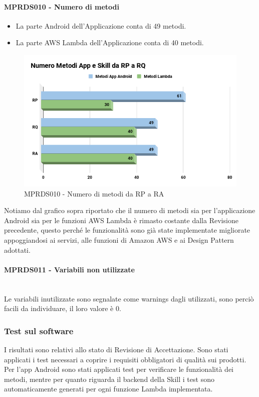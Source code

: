 \paragraph{MPRDS010 - Numero di metodi}
\begin{itemize}
	\item La parte Android dell'Applicazione conta di 49 metodi.
	\item La parte AWS Lambda dell'Applicazione conta di 40 metodi.
\end{itemize}
\begin{figure}[H]
	\centering
	\includegraphics[width=13cm,keepaspectratio]{../includes/pics/nMetodiRA.png}
	\caption{\label{fig:mission}MPRDS010 -  Numero di metodi da RP a RA}
\end{figure}
Notiamo dal grafico sopra riportato che il numero di metodi sia per l'applicazione Android sia per le funzioni AWS Lambda è rimasto costante dalla Revisione precedente, questo perché le funzionalità sono già state implementate migliorate appoggiandosi ai servizi, alle funzioni di Amazon AWS e ai Design Pattern adottati.
\paragraph{MPRDS011 - Variabili non utilizzate}\mbox{}\\[0.4cm]
Le variabili inutilizzate sono segnalate come warnings dagli  utilizzati, sono perciò facili da individuare, il loro valore è 0.
\subsubsection{Test sul software}
I risultati sono relativi allo stato di Revisione di Accettazione. Sono stati applicati i test necessari a coprire i requisiti obbligatori di qualità sui prodotti. Per l'app Android sono stati applicati test per verificare le funzionalità dei metodi, mentre per quanto riguarda il backend della Skill i test sono automaticamente generati per ogni funzione Lambda implementata.
\pagebreak
